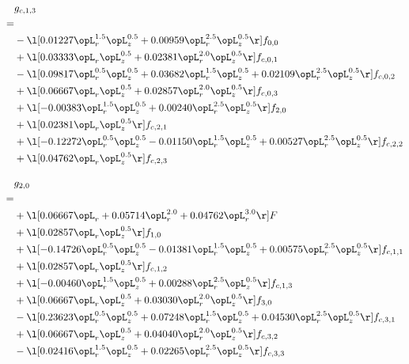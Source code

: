 \begin{alignat}{2} 
\label{eq:g_13_0} 
& g_{c,1,3} \nonumber \\ 
 = \\ 
& - \l[  0.01227 \opL_r^{1.5} \opL_z^{0.5} +  0.00959 \opL_r^{2.5} \opL_z^{0.5}  \r] f_{0,0} \nonumber \\ 
& + \l[  0.03333 \opL_r \opL_z^{0.5} +  0.02381 \opL_r^{2.0} \opL_z^{0.5}  \r] f_{c,0,1} \nonumber \\ 
& - \l[  0.09817 \opL_r^{0.5} \opL_z^{0.5} +  0.03682 \opL_r^{1.5} \opL_z^{0.5} +  0.02109 \opL_r^{2.5} \opL_z^{0.5}  \r] f_{c,0,2} \nonumber \\ 
& + \l[  0.06667 \opL_r \opL_z^{0.5} +  0.02857 \opL_r^{2.0} \opL_z^{0.5}  \r] f_{c,0,3} \nonumber \\ 
& + \l[  -0.00383 \opL_r^{1.5} \opL_z^{0.5} +  0.00240 \opL_r^{2.5} \opL_z^{0.5}  \r] f_{2,0} \nonumber \\ 
& + \l[  0.02381 \opL_r \opL_z^{0.5}  \r] f_{c,2,1} \nonumber \\ 
& + \l[  -0.12272 \opL_r^{0.5} \opL_z^{0.5}   -0.01150 \opL_r^{1.5} \opL_z^{0.5} +  0.00527 \opL_r^{2.5} \opL_z^{0.5}  \r] f_{c,2,2} \nonumber \\ 
& + \l[  0.04762 \opL_r \opL_z^{0.5}  \r] f_{c,2,3} \nonumber \\ 
\end{alignat} 


\begin{alignat}{2} 
\label{eq:g_20_0} 
& g_{2,0} \nonumber \\ 
 = \\ 
& + \l[  0.06667 \opL_r +  0.05714 \opL_r^{2.0} +  0.04762 \opL_r^{3.0}  \r] F \nonumber \\ 
& + \l[  0.02857 \opL_r \opL_z^{0.5}  \r] f_{1,0} \nonumber \\ 
& + \l[  -0.14726 \opL_r^{0.5} \opL_z^{0.5}   -0.01381 \opL_r^{1.5} \opL_z^{0.5} +  0.00575 \opL_r^{2.5} \opL_z^{0.5}  \r] f_{c,1,1} \nonumber \\ 
& + \l[  0.02857 \opL_r \opL_z^{0.5}  \r] f_{c,1,2} \nonumber \\ 
& + \l[  -0.00460 \opL_r^{1.5} \opL_z^{0.5} +  0.00288 \opL_r^{2.5} \opL_z^{0.5}  \r] f_{c,1,3} \nonumber \\ 
& + \l[  0.06667 \opL_r \opL_z^{0.5} +  0.03030 \opL_r^{2.0} \opL_z^{0.5}  \r] f_{3,0} \nonumber \\ 
& - \l[  0.23623 \opL_r^{0.5} \opL_z^{0.5} +  0.07248 \opL_r^{1.5} \opL_z^{0.5} +  0.04530 \opL_r^{2.5} \opL_z^{0.5}  \r] f_{c,3,1} \nonumber \\ 
& + \l[  0.06667 \opL_r \opL_z^{0.5} +  0.04040 \opL_r^{2.0} \opL_z^{0.5}  \r] f_{c,3,2} \nonumber \\ 
& - \l[  0.02416 \opL_r^{1.5} \opL_z^{0.5} +  0.02265 \opL_r^{2.5} \opL_z^{0.5}  \r] f_{c,3,3} \nonumber \\ 
\end{alignat} 


